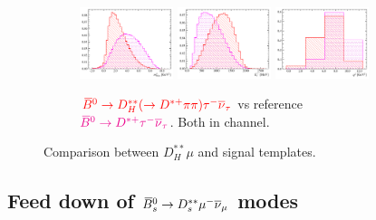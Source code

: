 \begin{figure}[!htb]
    \begin{subfigure}{\textwidth}
        \centering
        \includegraphics[width=0.3\textwidth]{figs-fit-fit-templates/histo-comp/Dst_iso_DstTau__vs__Dst_iso_DststHMuDst__m2miss.pdf}
        \includegraphics[width=0.3\textwidth]{figs-fit-fit-templates/histo-comp/Dst_iso_DstTau__vs__Dst_iso_DststHMuDst__el.pdf}
        \includegraphics[width=0.3\textwidth]{figs-fit-fit-templates/histo-comp/Dst_iso_DstTau__vs__Dst_iso_DststHMuDst__q2.pdf}
        \caption{
            $\textcolor{red}{{{\kern 0.18em\overline{\kern -0.18em B}}{}^0} \rightarrow {\ensuremath{D}}_H^{**} (\rightarrow {\ensuremath{{D}^{*+}}}\pi\pi) {\tau^-}{{\overline{\nu}}_\tau}}$
            vs reference
            $\textcolor{magenta}{{{\kern 0.18em\overline{\kern -0.18em B}}{}^0} \rightarrow {\ensuremath{{D}^{*+}}}{\ensuremath{\tau^-}}{\ensuremath{{\overline{\nu}}_\tau}}}$.
            Both in \Dstar channel.
        }
    \end{subfigure}

    \caption{Comparison between $D_H^{**}\mu$ and \Dz\taum signal templates.}
    \label{fig:dstst-heavy}
\end{figure}


\subsection{Feed down of ${{\kern 0.18em\overline{\kern -0.18em B}}{}^0_{s}} \rightarrow D_s^{**}{\mu^-}{{\overline{\nu}}_\mu}$ modes}

